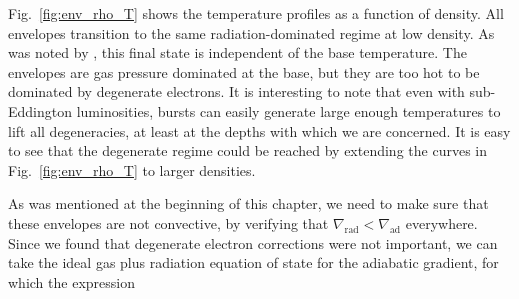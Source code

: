 \documentclass[../main.tex]{subfiles}
\begin{document}
Fig.~\ref{fig:env_rho_T} shows the temperature profiles as a function of density. All envelopes transition to the same radiation-dominated regime at low density. As was noted by \citet{Paczynski1986a}, this final state is independent of the base temperature. The envelopes are gas pressure dominated at the base, but they are too hot to be dominated by degenerate electrons. It is interesting to note that even with sub-Eddington luminosities, bursts can easily generate large enough temperatures to lift all degeneracies, at least at the depths with which we are concerned. It is easy to see that the degenerate regime could be reached by extending the curves in Fig.~\ref{fig:env_rho_T} to larger densities. 

As was mentioned at the beginning of this chapter, we need to make sure that these envelopes are not convective, by verifying that $\nabla_\text{rad}<\nabla_\text{ad}$ everywhere. Since we found that degenerate electron corrections were not important, we can take the ideal gas plus radiation equation of state for the adiabatic gradient, for which the expression
\end{document}
